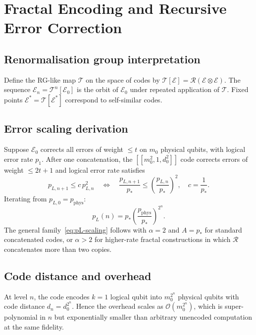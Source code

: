 \section{Fractal Encoding and Recursive Error Correction}
\label{sec:ch21-fractal}

\subsection{Renormalisation group interpretation}

Define the RG-like map $\mathcal{T}$ on the space of codes by
$\mathcal{T}[\mathcal{E}] = \mathcal{R}(\mathcal{E} \otimes \mathcal{E})$.
The sequence $\mathcal{E}_n = \mathcal{T}^n[\mathcal{E}_0]$ is the
orbit of $\mathcal{E}_0$ under repeated application of $\mathcal{T}$.
Fixed points $\mathcal{E}^* = \mathcal{T}[\mathcal{E}^*]$ correspond to
self-similar codes.

\subsection{Error scaling derivation}

Suppose $\mathcal{E}_0$ corrects all errors of weight $\leq t$ on
$m_0$ physical qubits, with logical error rate $p_1$.  After one
concatenation, the $[[m_0^2, 1, d_0^2]]$ code corrects errors of weight
$\leq 2t+1$ and logical error rate satisfies
\begin{equation}\label{eq:pL-step}
  p_{L,n+1} \leq c\, p_{L,n}^2
  \quad\Longleftrightarrow\quad
  \frac{p_{L,n+1}}{p_*} \leq \left(\frac{p_{L,n}}{p_*}\right)^2,
  \quad c = \frac{1}{p_*}.
\end{equation}
Iterating from $p_{L,0} = p_{\mathrm{phys}}$:
\begin{equation}\label{eq:pL-iterate}
  p_L(n) = p_* \left(\frac{p_{\mathrm{phys}}}{p_*}\right)^{2^n}.
\end{equation}
The general family~\eqref{eq:pL-scaling} follows with $\alpha = 2$ and
$A = p_*$ for standard concatenated codes, or $\alpha > 2$ for
higher-rate fractal constructions in which $\mathcal{R}$ concatenates
more than two copies.

\subsection{Code distance and overhead}

At level $n$, the code encodes $k = 1$ logical qubit into
$m_0^{2^n}$ physical qubits with code distance $d_n = d_0^{2^n}$.
Hence the overhead scales as $\mathcal{O}(m_0^{2^n})$, which is
super-polynomial in $n$ but exponentially smaller than arbitrary
unencoded computation at the same fidelity.

